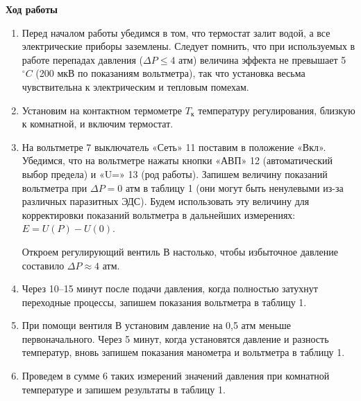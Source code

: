 \documentclass[a4paper, 12pt]{article}
\begin{document}
\begin{center}
	\textbf{\LARGE Ход работы}
\end{center}

\begin{enumerate}
\item Перед началом работы убедимся в том, что термостат залит водой, а все электрические приборы заземлены. Следует помнить, что при используемых в работе перепадах давления ($\Delta P \leqslant 4$ атм) величина эффекта не превышает 5$^\circ C$ (200 мкВ по показаниям вольтметра), так что установка весьма чувствительна к электрическим и тепловым помехам.


\item Установим на контактном термометре $T_{\text{к}}$ температуру регулирования, близкую к комнатной, и включим термостат.

\item На вольтметре 7 выключатель «Сеть» 11 поставим в положение «Вкл». Убедимся, что на вольтметре нажаты кнопки «АВП» 12 (автоматический выбор предела) и «U=» 13 (род работы). Запишем величину показаний вольтметра при
$\Delta P = 0$ атм в таблицу 1 (они могут быть ненулевыми из-за различных паразитных ЭДС). Будем использовать эту величину для корректировки показаний вольтметра в дальнейших измерениях: $E = U(P) - U(0)$.

Откроем регулирующий вентиль В настолько, чтобы избыточное давление составило $\Delta P \approx 4$ атм.

\item Через 10–15 минут после подачи давления, когда полностью затухнут переходные процессы, запишем показания вольтметра в таблицу 1.

\item При помощи вентиля В установим давление на 0,5 атм меньше первоначального. Через 5 минут, когда установятся давление и разность температур, вновь запишем показания манометра и вольтметра в таблицу 1.

\item Проведем в сумме 6 таких измерений значений давления при комнатной температуре и запишем результаты в таблицу 1.


\end{enumerate}
\end{document}

